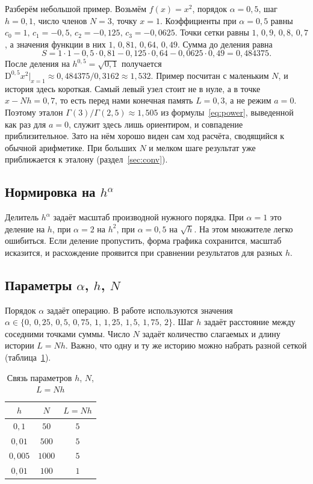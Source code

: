 \documentclass[14pt,a4paper]{extarticle}
\newcommand{\D}{\mathrm{D}}
\begin{document}
Разберём небольшой пример. Возьмём $f(x)=x^2$, порядок $\alpha=0{,}5$, шаг $h=0{,}1$, число членов $N=3$, точку $x=1$. Коэффициенты при $\alpha=0{,}5$ равны $c_0=1,\,c_1=-0{,}5,\,c_2=-0{,}125,\,c_3=-0{,}0625$. Точки сетки равны $1,\,0{,}9,\,0{,}8,\,0{,}7$, а значения функции в них $1,\,0{,}81,\,0{,}64,\,0{,}49$. Сумма до деления равна
\begin{equation}
S=1\cdot1-0{,}5\cdot0{,}81-0{,}125\cdot0{,}64-0{,}0625\cdot0{,}49=0{,}484375.
\end{equation}
После деления на $h^{0{,}5}=\sqrt{0{,}1}$ получается $\D^{0{,}5}x^2\big|_{x=1}\approx0{,}484375/0{,}3162\approx1{,}532$. Пример посчитан с маленьким $N$, и история здесь короткая. Самый левый узел стоит не в нуле, а в точке $x-Nh=0{,}7$, то есть перед нами конечная память $L=0{,}3$, а не режим $a=0$. Поэтому эталон $\Gamma(3)/\Gamma(2{,}5)\approx1{,}505$ из формулы~\eqref{eq:power}, выведенной как раз для $a=0$, служит здесь лишь ориентиром, и совпадение приблизительное. Зато на нём хорошо виден сам ход расчёта, сводящийся к обычной арифметике. При больших $N$ и мелком шаге результат уже приближается к эталону (раздел~\ref{sec:conv}).

\subsection{Нормировка на $h^{\alpha}$}

Делитель $h^{\alpha}$ задаёт масштаб производной нужного порядка. При $\alpha=1$ это деление на $h$, при $\alpha=2$ на $h^2$, при $\alpha=0{,}5$ на $\sqrt{h}$. На этом множителе легко ошибиться. Если деление пропустить, форма графика сохранится, масштаб исказится, и расхождение проявится при сравнении результатов для разных $h$.

\subsection{Параметры $\alpha$, $h$, $N$}

Порядок $\alpha$ задаёт операцию. В работе используются значения $\alpha\in\{0,\,0{,}25,\,0{,}5,\,0{,}75,\,1,\,1{,}25,\,1{,}5,\,1{,}75,\,2\}$. Шаг $h$ задаёт расстояние между соседними точками суммы. Число $N$ задаёт количество слагаемых и длину истории $L=Nh$. Важно, что одну и ту же историю можно набрать разной сеткой (таблица~\ref{tab:hnl}).

\begin{table}[htbp]
\centering
\caption{Связь параметров $h$, $N$, $L=Nh$}
\label{tab:hnl}
\begin{tabular}{|c|c|c|}
\hline
$h$ & $N$ & $L=Nh$ \\
\hline
$0{,}1$   & $50$   & $5$ \\
\hline
$0{,}01$  & $500$  & $5$ \\
\hline
$0{,}005$ & $1000$ & $5$ \\
\hline
$0{,}01$  & $100$  & $1$ \\
\hline
\end{tabular}
\end{table}
\end{document}
